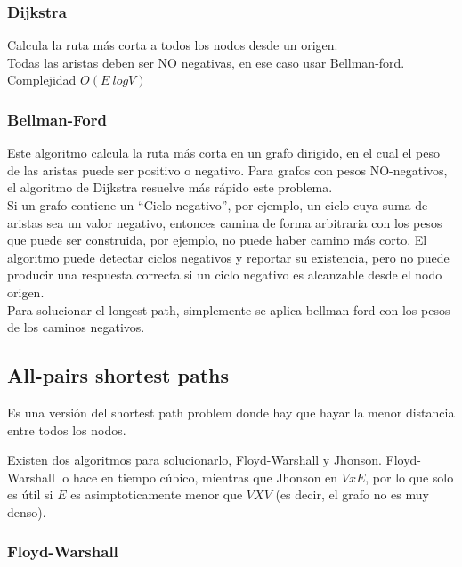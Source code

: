 \documentclass[10pt,letterpaper,twocolumn,twosided]{article}
\newcommand{\codigofuente}[1]{

\dotfill
}
\begin{document}
\subsubsection{Dijkstra}

Calcula la ruta más corta a todos los nodos desde un origen.\\
Todas las aristas deben ser NO negativas, en ese caso usar Bellman-ford.\\
Complejidad $O(E\ log V)$

\codigofuente{src/graphs/dijkstra.cpp}


\subsubsection{Bellman-Ford}
Este algoritmo calcula la ruta más corta en un grafo dirigido, en el cual el peso de las aristas puede 
ser positivo o negativo. Para grafos con pesos NO-negativos, el algoritmo de Dijkstra resuelve más
rápido este problema.\\


Si un grafo contiene un ``Ciclo negativo'', por ejemplo, un ciclo cuya suma de aristas sea un valor negativo,
entonces camina de forma arbitraria con los pesos que puede ser construida, por ejemplo, no puede haber camino más corto.
El algoritmo puede detectar ciclos negativos y reportar su existencia, pero no puede producir una respuesta correcta
si un ciclo negativo es alcanzable desde el nodo origen.\\

Para solucionar el longest path, simplemente se aplica bellman-ford con los pesos de los caminos negativos.

\codigofuente{src/graphs/bellman.cpp}

\subsection{All-pairs shortest paths}

Es una versión del shortest path problem donde hay que hayar la menor distancia entre todos los nodos.

Existen dos algoritmos para solucionarlo, Floyd-Warshall y Jhonson. Floyd-Warshall lo hace en tiempo cúbico, 
mientras que Jhonson en $V x E$, por lo que solo es útil si $E$ es asimptoticamente menor que $V X V$ (es decir,
el grafo no es muy denso).

\subsubsection{Floyd-Warshall}
\end{document}
